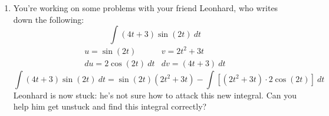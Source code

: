\documentclass[10pt]{article}
\newenvironment{red}{\color{red}}{\ignorespacesafterend}
\begin{document}
\begin{enumerate}[leftmargin=0pt]
\begin{enumerate}
    \item $\int x^3\sin(x^4)\ dx$
    
    \begin{red}
    Ah ha, now we can use substitution. If $u = x^4$, then $\frac{du}{dx} = 4x^3$, so $dx = \frac{du}{4x^3}$.
    
    \begin{align*}
        \int x^3\sin(x^4)\ dx &= \int x^3 \sin(u)\ \frac{du}{4x^3} = \frac14 \int \sin(u)\ du = \frac14(\cos(u)) = -\frac14\cos(x^4)+ C
    \end{align*}
    \end{red}
    
    \item $\int x^7 \sin(x^4)\ dx = \int x^4\cdot (x^3\sin(x^4))\ dx$
    
    \begin{red}
    We'll use a similar trick as we did in part (b):
    \[\begin{array}{ll}
        u = x^4 &  \\
         & dv = x^3\sin(x^4)\ dx
    \end{array}
    \textrm{ so then }
    \begin{array}{ll}
        u = x^4 & \ \ v = -\tfrac14 \cos(x^4) \\
        du = 4x^3\ dx &  dv = x^3\sin(x^4)\ dx
    \end{array}
    \]
    Applying integration by parts:
    \begin{align*}
        \int x^4\cdot (x^3\sin(x^4))\ dx &= x^4 \cdot \left(-\tfrac14 \cos(x^4)\right) - \int -\tfrac14\cos(x^4)\cdot 4x^3\ dx \\
        &= -\tfrac14 x^4\cos(x^4) + \int x^3\cos(x^4)\ dx\\
        \intertext{We'll use the substitution $t = x^4$, $dt = 4x^3\ dx$ to evaluate the second integral.}
        &= -\frac14 x^4\cos(x^4) + \frac14 \int \cos(t)\ dt
         = -\frac14 x^4\cos(x^4) + \frac14 \sin(t) 
         = -\frac14 x^4\cos(x^4) + \frac14 \sin(x^4) + C
    \end{align*}
    \end{red}
\end{enumerate}


\item You're working on some problems with your friend Leonhard, who writes down the following:
\[\int (4t+3)\sin(2t)\ dt
\]
\[\begin{array}{ll}
    u = \sin(2t) & v = 2t^2 + 3t \\
    du = 2\cos(2t)\ dt & dv = (4t + 3)\ dt 
\end{array}
\]
\[\int (4t+3)\sin(2t)\ dt = \sin(2t)(2t^2+3t) - \int\left[(2t^2+3t)\cdot 2\cos(2t)\right]\ dt
\]
Leonhard is now stuck: he's not sure how to attack this new integral. Can you help him get unstuck and find this integral correctly?


\end{enumerate}
\end{document}
